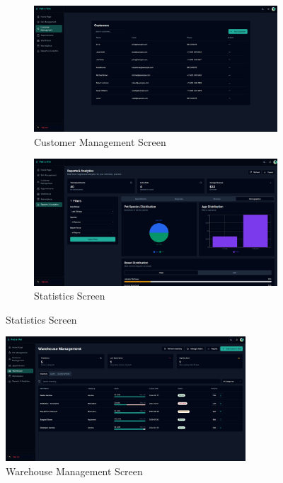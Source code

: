 \documentclass[12pt,a4paper,twoside]{book}
\begin{document}
\begin{figure}[H]
    \centering
    \begin{subfigure}[b]{0.48\textwidth}
        \centering
        \includegraphics[width=\textwidth]{Resources/Final UI/customer-management.png}
        \caption{Customer Management Screen}\label{fig:customer-management-screen}
    \end{subfigure}
    \hfill
    \begin{subfigure}[b]{0.48\textwidth}
        \centering
        \includegraphics[width=\textwidth]{Resources/Final UI/statistics.png}
        \caption{Statistics Screen}\label{fig:statistics-screen}
    \end{subfigure}
\end{figure}

\begin{figure}[H]
  \centering
    \includegraphics[width=0.8\textwidth]{Resources/Final UI/warehouse.png}
    \caption{Warehouse Management Screen}\label{fig:warehouse-management-screen}
\end{figure}
\end{document}
